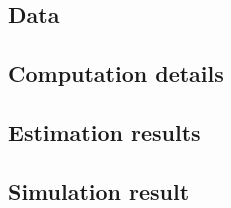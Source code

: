 \subsection{Data}


\subsection{Computation details}


\subsection{Estimation results}


\subsection{Simulation result}



